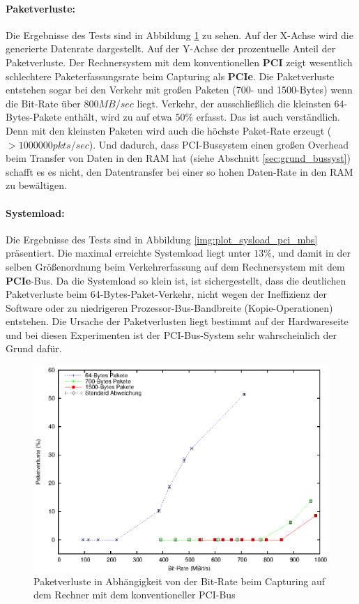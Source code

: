 {\paragraph*{Paketverluste:}
Die Ergebnisse des Tests sind in Abbildung \ref{img:plot_pktlos_pci_mbs} zu
sehen. Auf der X-Achse wird die generierte Datenrate dargestellt. Auf der
Y-Achse der prozentuelle Anteil der Paketverluste. Der Rechnersystem mit dem
konventionellen \textbf{PCI} zeigt wesentlich schlechtere Paketerfassungsrate
beim Capturing als \textbf{PCIe}. Die Paketverluste entstehen sogar bei den
Verkehr mit großen Paketen (700- und 1500-Bytes) wenn die Bit-Rate über $800
MB/sec$ liegt. Verkehr, der ausschließlich die kleinsten 64-Bytes-Pakete
enthält, wird zu auf etwa $50\%$ erfasst. Das ist auch verständlich. Denn mit
den kleinsten Paketen wird auch die höchste Paket-Rate erzeugt ($>1000000
pkts/sec$).  Und dadurch, dass PCI-Bussystem einen großen Overhead beim
Transfer von Daten in den RAM hat (siehe Abschnitt \ref{sec:grund_bussyst})
schafft es es nicht, den Datentransfer bei einer so hohen Daten-Rate in den RAM
zu bewältigen.

\paragraph*{Systemload:}
Die Ergebnisse des Tests sind in Abbildung \ref{img:plot_sysload_pci_mbs}
präsentiert.  Die maximal erreichte Systemload liegt unter $13\%$, und damit in
der selben Größenordnung beim Verkehrerfassung auf dem Rechnersystem mit dem
\textbf{PCIe}-Bus. Da die Systemload so klein ist, ist sichergestellt, dass die
deutlichen Paketverluste beim 64-Bytes-Paket-Verkehr, nicht wegen der
Ineffizienz der Software oder zu niedrigeren Prozessor-Bus-Bandbreite
(Kopie-Operationen) entstehen.  Die Ursache der Paketverlusten liegt bestimmt
auf der Hardwareseite und bei diesen Experimenten ist der PCI-Bus-System sehr
wahrscheinlich der Grund dafür.
\begin{figure} 
\centering \includegraphics[width=5.5in]{plots/graphs/pktloss_PCI_mbs.eps}
\caption{Paketverluste in Abhängigkeit von der Bit-Rate beim Capturing auf dem Rechner mit dem konventioneller PCI-Bus}
\label{img:plot_pktlos_pci_mbs}
\end{figure}

}
